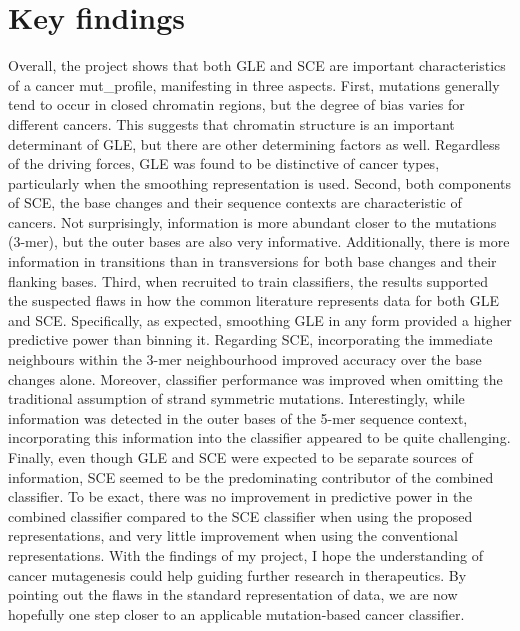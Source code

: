 \section{Key findings}
\label{intro:findings}
Overall, the project shows that both GLE and SCE are important characteristics of a cancer \gls{mut_profile}, manifesting in three aspects. First, mutations generally tend to occur in closed chromatin regions, but the degree of bias varies for different cancers. This suggests that chromatin structure is an important determinant of GLE, but there are other determining factors as well. Regardless of the driving forces, GLE was found to be distinctive of cancer types, particularly when the smoothing representation is used. Second, both components of SCE, the base changes and their sequence contexts are characteristic of cancers. Not surprisingly, information is more abundant closer to the mutations (3-mer), but the outer bases are also very informative. Additionally, there is more information in \glspl{transition} than in \glspl{transversion} for both base changes and their flanking bases. Third, when recruited to train classifiers, the results supported the suspected flaws in how the common literature represents data for both GLE and SCE. Specifically, as expected, smoothing GLE in any form provided a higher predictive power than binning it. Regarding SCE, incorporating the immediate neighbours within the 3-mer neighbourhood improved accuracy over the base changes alone. Moreover, classifier performance was improved when omitting the traditional assumption of strand symmetric mutations. Interestingly, while information was detected in the outer bases of the 5-mer sequence context, incorporating this information into the classifier appeared to be quite challenging. Finally, even though GLE and SCE were expected to be separate sources of information, SCE seemed to be the predominating contributor of the combined classifier. To be exact, there was no improvement in predictive power in the combined classifier compared to the SCE classifier when using the proposed representations, and very little improvement when using the conventional representations. With the findings of my project, I hope the understanding of cancer mutagenesis could help guiding further research in therapeutics. By pointing out the flaws in the standard representation of data, we are now hopefully one step closer to an applicable mutation-based cancer classifier. 

